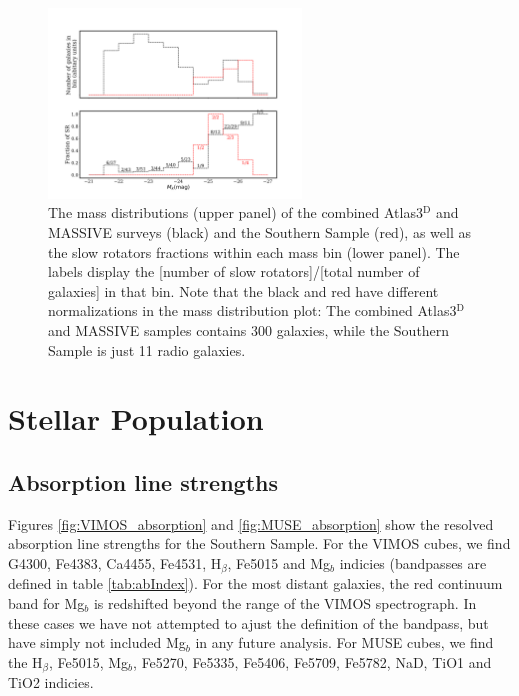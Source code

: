 		

		\begin{figure}
			\centering
			\includegraphics[width=0.6\textwidth]{chapter4/M_k_binned.png}
			\caption[Mass matching global kinematics]{The mass distributions (upper panel) of the combined Atlas3$^\text{D}$ and MASSIVE surveys (black) and the Southern Sample (red), as well as the slow rotators fractions within each mass bin (lower panel). The labels display the [number of slow rotators]/[total number of galaxies] in that bin. Note that the black and red have different normalizations in the mass distribution plot: The combined Atlas3$^\text{D}$ and MASSIVE samples contains 300 galaxies, while the Southern Sample is just 11 radio galaxies.}
			\label{fig:SRmassFraction}
		\end{figure}


		





\section{Stellar Population}
	\label{sec:pop}

	\subsection{Absorption line strengths}
		\label{subsec:absorption}
		Figures \ref{fig:VIMOS_absorption} and \ref{fig:MUSE_absorption} show the resolved absorption line strengths for the Southern Sample. For the VIMOS cubes, we find G4300, Fe4383, Ca4455, Fe4531, H$_\beta$, Fe5015 and Mg$_b$ indicies (bandpasses are defined in table \ref{tab:abIndex}). For the most distant galaxies, the red continuum band for Mg$_b$ is redshifted beyond the range of the VIMOS spectrograph. In these cases we have not attempted to ajust the definition of the bandpass, but have simply not included Mg$_b$ in any future analysis. For MUSE cubes, we find the H$_\beta$, Fe5015, Mg$_b$, Fe5270, Fe5335, Fe5406, Fe5709, Fe5782, NaD, TiO1 and TiO2 indicies. 

